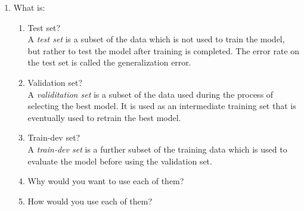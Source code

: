 \documentclass[a4paper,10pt]{article}
\begin{document}
\begin{enumerate}
	\item What is:
	\begin{enumerate}
		\item Test set? \\
		A \emph{test set} is a subset of the data which is not used to train the model, but rather to test the model after training is completed. The error rate on the test set is called the generalization error.
		\item Validation set? \\
		A \emph{validitation set} is a subset of the data used during the process of selecting the best model.
		It is used as an intermediate training set that is eventually used to retrain the best model.
		\item Train-dev set? \\
		A \emph{train-dev set} is a further subset of the training data which is used to evaluate the model before using the validation set.
		\item Why would you want to use each of them? 
		\item How would you use each of them? 
	\end{enumerate}
\end{enumerate}
	
\end{document}
